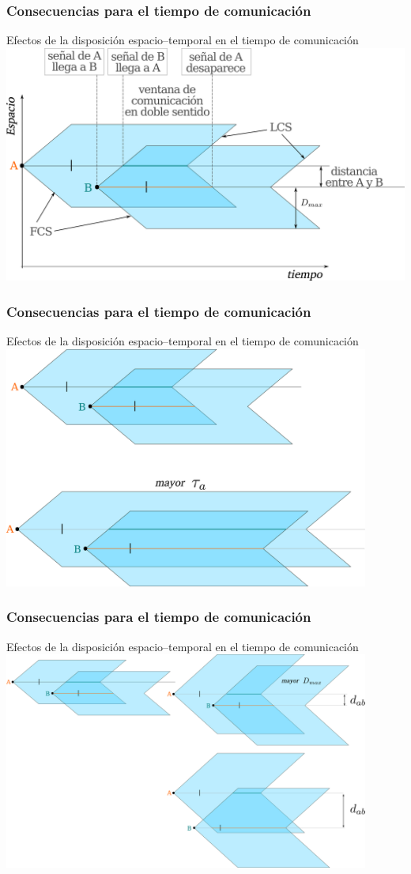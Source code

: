 \documentclass[handout]{beamer}
\theoremstyle{plain}
\theoremstyle{definition}
\theoremstyle{remark}
\begin{document}
\begin{frame}\frametitle{Consecuencias para el tiempo de comunicación}
Efectos de la disposición espacio--temporal en el tiempo de comunicación
\centering
\includegraphics[width=\textwidth]{text4616-5-8-3-4-2.png}
\end{frame}   

\begin{frame}\frametitle{Consecuencias para el tiempo de comunicación}
Efectos de la disposición espacio--temporal en el tiempo de comunicación
\centering
\includegraphics[width=0.9\textwidth]{path9650-0.png}
\end{frame}   

\begin{frame}\frametitle{Consecuencias para el tiempo de comunicación}
Efectos de la disposición espacio--temporal en el tiempo de comunicación
\centering
\includegraphics[width=0.9\textwidth]{g10765.png}
\end{frame}   
\end{document}
